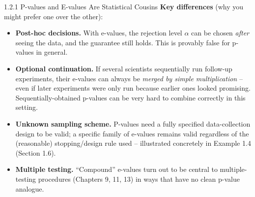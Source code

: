 \documentclass[aspectratio=169,10pt]{beamer}
\begin{document}
\begin{frame}[allowframebreaks]{1.2.1 P-values and E-values Are Statistical Cousins}
\textbf{Key differences} (why you might prefer one over the other):
\begin{itemize}
  \item \textbf{Post-hoc decisions.} With e-values, the rejection level
    $\alpha$ can be chosen \emph{after} seeing the data, and the guarantee
    still holds. This is provably false for p-values in general.
  \item \textbf{Optional continuation.} If several scientists sequentially
    run follow-up experiments, their e-values can always be \emph{merged
    by simple multiplication} -- even if later experiments were only run
    because earlier ones looked promising. Sequentially-obtained p-values
    can be very hard to combine correctly in this setting.
  \item \textbf{Unknown sampling scheme.} P-values need a fully specified
    data-collection design to be valid; a specific family of e-values
    remains valid regardless of the (reasonable) stopping/design rule used
    -- illustrated concretely in Example 1.4 (Section 1.6).
  \item \textbf{Multiple testing.} ``Compound'' e-values turn out to be
    central to multiple-testing procedures (Chapters 9, 11, 13) in ways
    that have no clean p-value analogue.
\end{itemize}

\end{frame}
\end{document}
